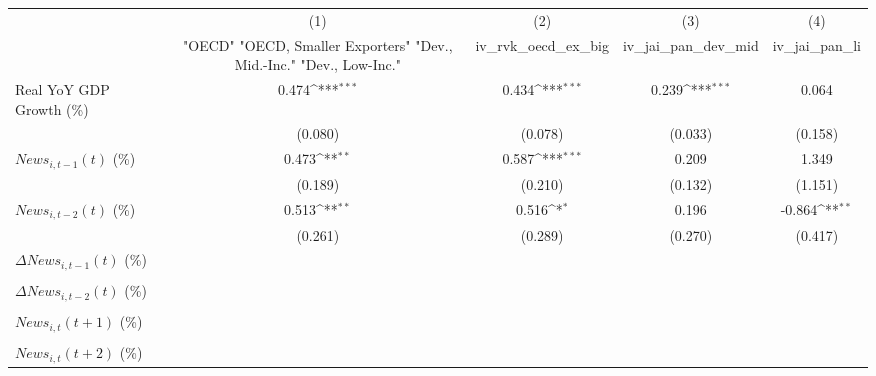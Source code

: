 {
\def\sym#1{\ifmmode^{#1}\else\(^{#1}\)\fi}
\begin{tabular}{l*{4}{c}}
\toprule
                    &\multicolumn{1}{c}{(1)}&\multicolumn{1}{c}{(2)}&\multicolumn{1}{c}{(3)}&\multicolumn{1}{c}{(4)}\\
                    &\multicolumn{1}{c}{ "OECD" "OECD, Smaller Exporters" "Dev., Mid.-Inc." "Dev., Low-Inc."}&\multicolumn{1}{c}{iv_rvk_oecd_ex_big}&\multicolumn{1}{c}{iv_jai_pan_dev_mid}&\multicolumn{1}{c}{iv_jai_pan_li}\\
\midrule
Real YoY GDP Growth (\%)&       0.474\sym{***}&       0.434\sym{***}&       0.239\sym{***}&       0.064         \\
                    &     (0.080)         &     (0.078)         &     (0.033)         &     (0.158)         \\
\addlinespace
$ News_{i,t-1}(t)$ (\%)&       0.473\sym{**} &       0.587\sym{***}&       0.209         &       1.349         \\
                    &     (0.189)         &     (0.210)         &     (0.132)         &     (1.151)         \\
\addlinespace
$ News_{i,t-2}(t)$ (\%)&       0.513\sym{**} &       0.516\sym{*}  &       0.196         &      -0.864\sym{**} \\
                    &     (0.261)         &     (0.289)         &     (0.270)         &     (0.417)         \\
\addlinespace
$ \Delta News_{i,t-1}(t)$ (\%)&                     &                     &                     &                     \\
                    &                     &                     &                     &                     \\
\addlinespace
$ \Delta News_{i,t-2}(t)$ (\%)&                     &                     &                     &                     \\
                    &                     &                     &                     &                     \\
\addlinespace
$ News_{i,t}(t+1)$ (\%)&                     &                     &                     &                     \\
                    &                     &                     &                     &                     \\
\addlinespace
$ News_{i,t}(t+2)$ (\%)&                     &                     &                     &                     \\

\end{tabular}}

